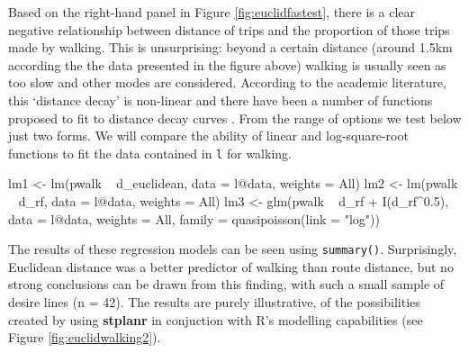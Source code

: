 Based on the right-hand panel in Figure \ref{fig:euclidfastest}, there
is a clear negative relationship between distance of trips and the
proportion of those trips made by walking. This is unsurprising: beyond
a certain distance (around 1.5km according the the data presented in the
figure above) walking is usually seen as too slow and other modes are
considered. According to the academic literature, this `distance decay'
is non-linear and there have been a number of functions proposed to fit
to distance decay curves \citep{martinez_new_2013}. From the range of
options we test below just two forms. We will compare the ability of
linear and log-square-root functions to fit the data contained in
\texttt{l} for walking.

\begin{Schunk}
\begin{Sinput}
lm1 <- lm(pwalk ~ d_euclidean, data = l@data, weights = All)
lm2 <- lm(pwalk ~ d_rf, data = l@data, weights = All)
lm3 <- glm(pwalk ~ d_rf + I(d_rf^0.5),
           data = l@data, weights = All, family = quasipoisson(link = "log"))
\end{Sinput}
\end{Schunk}

The results of these regression models can be seen using
\texttt{summary()}. Surprisingly, Euclidean distance was a better
predictor of walking than route distance, but no strong conclusions can
be drawn from this finding, with such a small sample of desire lines (n
= 42). The results are purely illustrative, of the
possibilities created by using \textbf{stplanr} in conjuction with R's
modelling capabilities (see Figure \vref{fig:euclidwalking2}).

